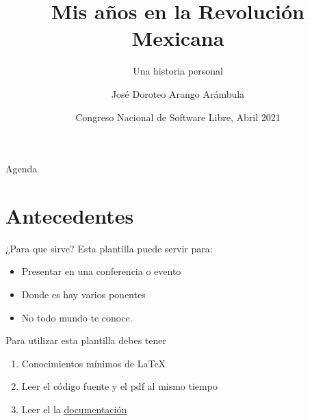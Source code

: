 \documentclass{beamer}
\title[La revolución]{Mis años en la Revolución Mexicana}
\subtitle{Una historia personal}
\author[Pancho Villa]{José Doroteo Arango Arámbula}
\institute[FES Acatlán]{
    \normalsize{\email{panchovilla@unam.mx}}
    \newline
    \newline
    \unam
}
\date[CONSOL 2021] %
{Congreso Nacional de Software Libre, Abril 2021}
\begin{document}
\begin{frame}{}
    \maketitle
\end{frame}

\begin{frame}{Agenda}
    \begin{multicols}{2}
        \tableofcontents
    \end{multicols}
\end{frame}

\section{Antecedentes}
 \begin{frame}{¿Para que sirve?}
     Esta plantilla puede servir para:
     \begin{itemize}
         \item Presentar en una conferencia o evento
         \item Donde es hay varios ponentes
         \item No todo mundo te conoce.
     \end{itemize}
% 
     \vspace{0.4cm} %
%     
     Para utilizar esta plantilla debes tener
     \begin{enumerate}
         \item Conocimientos mínimos de \LaTeX{}
         \item Leer el código fuente y el pdf al mismo tiempo
         \item Leer el la \href{https://github.com/nemediano/latexPlantillaUnam/blob/main/Notas/README.md}{documentación}
     \end{enumerate}
% 
     \vspace{0.2cm}
% 
 \end{frame}
\end{document}
